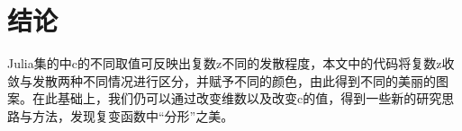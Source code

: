 \documentclass[UTF8,a4paper]{ctexart}
\begin{document}
	\begin{figure}[ht]
		\centering
	\end{figure}
	\newpage
	\section{结论}
	Julia集的中c的不同取值可反映出复数z不同的发散程度，本文中的代码将复数z收敛与发散两种不同情况进行区分，并赋予不同的颜色，由此得到不同的美丽的图案。在此基础上，我们仍可以通过改变维数以及改变c的值，得到一些新的研究思路与方法，发现复变函数中“分形”之美。
	
	
	
\end{document}
